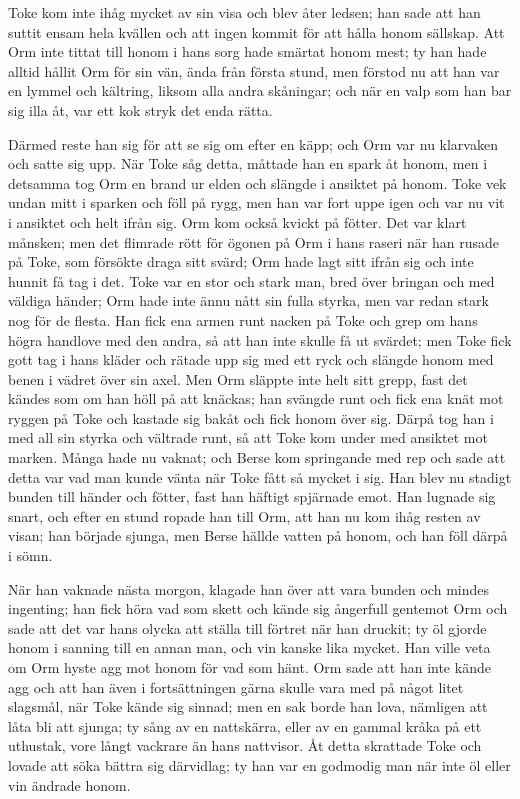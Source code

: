 \initial Toke kom inte ihåg mycket av sin visa och blev åter ledsen; han sade att han suttit ensam hela kvällen och att ingen kommit för att hålla honom sällskap. Att Orm inte tittat till honom i hans sorg hade smärtat honom mest; ty han hade alltid hållit Orm för sin vän, ända från första stund, men förstod nu att han var en lymmel och kältring, liksom alla andra skåningar; och när en valp som han bar sig illa åt, var ett kok stryk det enda rätta.

\initial Därmed reste han sig för att se sig om efter en käpp; och Orm var nu klarvaken och satte sig upp. När Toke såg detta, måttade han en spark åt honom, men i detsamma tog Orm en brand ur elden och slängde i ansiktet på honom. Toke vek undan mitt i sparken och föll på rygg, men han var fort uppe igen och var nu vit i ansiktet och helt ifrån sig. Orm kom också kvickt på fötter. Det var klart månsken; men det flimrade rött för ögonen på Orm i hans raseri när han rusade på Toke, som försökte draga sitt svärd; Orm hade lagt sitt ifrån sig och inte hunnit få tag i det. Toke var en stor och stark man, bred över bringan och med väldiga händer; Orm hade inte ännu nått sin fulla styrka, men var redan stark nog för de flesta. Han fick ena armen runt nacken på Toke och grep om hans högra handlove med den andra, så att han inte skulle få ut svärdet; men Toke fick gott tag i hans kläder och rätade upp sig med ett ryck och slängde honom med benen i vädret över sin axel. Men Orm släppte inte helt sitt grepp, fast det kändes som om han höll på att knäckas; han svängde runt och fick ena knät mot ryggen på Toke och kastade sig bakåt och fick honom över sig. Därpå tog han i med all sin styrka och vältrade runt, så att Toke kom under med ansiktet mot marken. Många hade nu vaknat; och Berse kom springande med rep och sade att detta var vad man kunde vänta när Toke fått så mycket i sig. Han blev nu stadigt bunden till händer och fötter, fast han häftigt spjärnade emot. Han lugnade sig snart, och efter en stund ropade han till Orm, att han nu kom ihåg resten av visan; han började sjunga, men Berse hällde vatten på honom, och han föll därpå i sömn.

\initial När han vaknade nästa morgon, klagade han över att vara bunden och mindes ingenting; han fick höra vad som skett och kände sig ångerfull gentemot Orm och sade att det var hans olycka att ställa till förtret när han druckit; ty öl gjorde honom i sanning till en annan man, och vin kanske lika mycket. Han ville veta om Orm hyste agg mot honom för vad som hänt. Orm sade att han inte kände agg och att han även i fortsättningen gärna skulle vara med på något litet slagsmål, när Toke kände sig sinnad; men en sak borde han lova, nämligen att låta bli att sjunga; ty sång av en nattskärra, eller av en gammal kråka på ett uthustak, vore långt vackrare än hans nattvisor. Åt detta skrattade Toke och lovade att söka bättra sig därvidlag; ty han var en godmodig man när inte öl eller vin ändrade honom.

